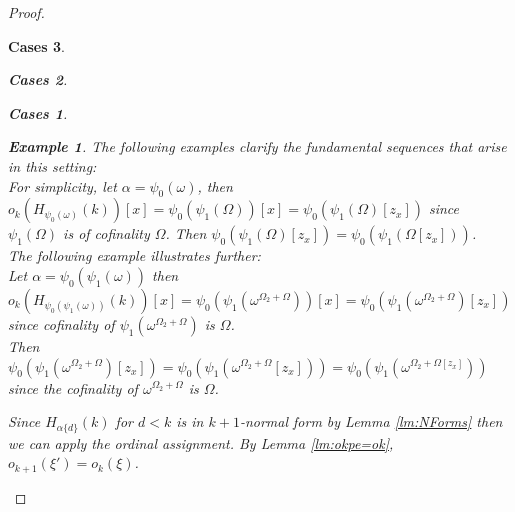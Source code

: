 \documentclass[10pt,a4paper]{amsart}
\newtheorem{Cases}{Cases}
\newtheorem{example}{Example}
\newcommand{\Om}{{\Omega}}
\newcommand{\al}{{\alpha}}
\newcommand{\ok}{o_{k}}
\newcommand{\okpe}{o_{k+1}}
\newcommand{\om}{\omega}
\begin{document}
\begin{proof}
\begin{Cases}
\begin{Cases}
\begin{Cases}
            \begin{example}
                The following examples clarify the fundamental sequences that arise in this setting:\\
                For simplicity, let $\al = \psi_0(\om)$, then $\ok(H_{\psi_0(\om)}(k))[x]= \psi_0(\psi_1(\Om))[x]= \psi_0(\psi_1(\Om)[z_x])$ since $\psi_1(\Om)$ is of cofinality $\Om$. Then $\psi_0(\psi_1(\Om)[z_x])= \psi_0(\psi_1(\Om[z_x]))$. \\
                The following example illustrates further:\\
                Let $\al = \psi_0(\psi_1(\om))$ then $\ok(H_{\psi_0(\psi_1(\om))}(k))[x] = \psi_0(\psi_1(\om^{\Om_2+\Om}))[x]= \psi_0(\psi_1(\om^{\Om_2+\Om})[z_x])$ since cofinality of $\psi_1(\om^{\Om_2+\Om})$ is $\Om$.\\
                Then
                $ \psi_0(\psi_1(\om^{\Om_2+\Om})[z_x])= \psi_0(\psi_1(\om^{\Om_2+\Om}[z_x]))= \psi_0(\psi_1(\om^{\Om_2+\Om[z_x]}))$ since the cofinality of $\om^{\Om_2+\Om}$ is $\Om$.\\
            \end{example}
            
            Since $H_{\al\{d\}}(k)$ for $d<k$ is in $k+1$-normal form by Lemma \ref{lm:NForms} then we can apply the ordinal assignment.
            By Lemma \ref{lm:okpe=ok}, $\okpe(\xi')=\ok(\xi)$.
            

\end{Cases}
\end{Cases}
\end{Cases}
\end{proof}
\end{document}
